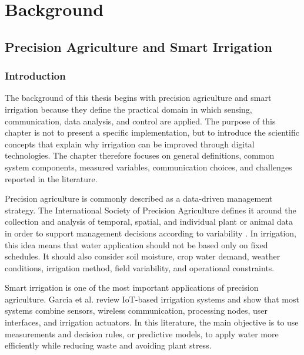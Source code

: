 \part{Background}

\chapter{Precision Agriculture and Smart Irrigation}

\newcommand{\selectedFigureBox}[3]{%
\fbox{\begin{minipage}{0.86\textwidth}
\centering
\vspace{0.35cm}
Selected figure: #1\\[0.15cm]
Save the downloaded image as:\\
\texttt{\detokenize{#2}}\\[0.15cm]
Paper link:\\
\url{#3}
\vspace{0.35cm}
\end{minipage}}}

\section{Introduction}

The background of this thesis begins with precision agriculture and smart irrigation because they define the practical domain in which sensing, communication, data analysis, and control are applied. The purpose of this chapter is not to present a specific implementation, but to introduce the scientific concepts that explain why irrigation can be improved through digital technologies. The chapter therefore focuses on general definitions, common system components, measured variables, communication choices, and challenges reported in the literature.

Precision agriculture is commonly described as a data-driven management strategy. The International Society of Precision Agriculture defines it around the collection and analysis of temporal, spatial, and individual plant or animal data in order to support management decisions according to variability \cite{ispa2024precisiondefinition}. In irrigation, this idea means that water application should not be based only on fixed schedules. It should also consider soil moisture, crop water demand, weather conditions, irrigation method, field variability, and operational constraints.

Smart irrigation is one of the most important applications of precision agriculture. Garcia et al. \cite{garcia2020iotirrigation} review IoT-based irrigation systems and show that most systems combine sensors, wireless communication, processing nodes, user interfaces, and irrigation actuators. In this literature, the main objective is to use measurements and decision rules, or predictive models, to apply water more efficiently while reducing waste and avoiding plant stress.

